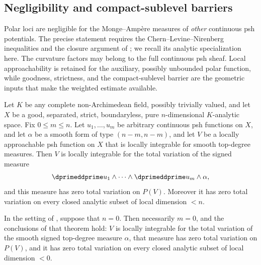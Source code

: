 \subsection{Negligibility and compact-sublevel barriers}

Polar loci are negligible for the Monge--Amp\`ere measures of \emph{other}
continuous psh potentials.  The precise statement requires the
Chern--Levine--Nirenberg inequalities and the closure argument of
; we recall its analytic specialization here.
The curvature factors may belong to the full continuous psh sheaf.  Local
approachability is retained for the auxiliary, possibly unbounded polar
function, while goodness, strictness, and the compact-sublevel barrier are
the geometric inputs that make the weighted estimate available.

\begin{theorem}
\label{thm:ch15-negligibility-recalled}
Let $K$ be any complete non-Archimedean field, possibly trivially valued,
and let $X$ be a good, separated, strict, boundaryless, pure
$n$-dimensional $K$-analytic space.  Fix $0\leq m\leq n$.  Let
$u_1,\dots,u_m$ be arbitrary continuous psh functions on $X$, and let
$\alpha$ be a smooth form of type
$(n-m,n-m)$, and let $V$ be a locally approachable psh function on $X$ that
is locally integrable for smooth top-degree measures.  Then $V$ is locally
integrable for the total variation of the signed measure
\[
 \dprimeddprime u_1\wedge\cdots\wedge
 \dprimeddprime u_m\wedge\alpha,
\]
and this measure has zero total variation on $P(V)$.  Moreover it has zero
total variation on every closed analytic subset of local dimension $<n$.
\end{theorem}

\begin{lemma}
\label{lem:ch15-negligibility-zero-dimensional-edge}
In the setting of , suppose that
$n=0$.  Then necessarily $m=0$, and the conclusions of that theorem hold:
$V$ is locally integrable for the total variation of the smooth signed
top-degree measure $\alpha$, that measure has zero total variation on
$P(V)$, and it has zero total variation on every closed analytic subset of
local dimension $<0$.
\end{lemma}

